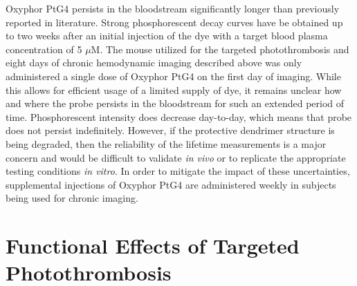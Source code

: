 Oxyphor PtG4 persists in the bloodstream significantly longer than previously reported in literature. Strong phosphorescent decay curves have be obtained up to two weeks after an initial injection of the dye with a target blood plasma concentration of 5 $\mu$M. The mouse utilized for the targeted photothrombosis and eight days of chronic hemodynamic imaging described above was only administered a single dose of Oxyphor PtG4 on the first day of imaging. While this allows for efficient usage of a limited supply of dye, it remains unclear how and where the probe persists in the bloodstream for such an extended period of time. Phosphorescent intensity does decrease day-to-day, which means that probe does not persist indefinitely. However, if the protective dendrimer structure is being degraded, then the reliability of the lifetime measurements is a major concern and would be difficult to validate \textit{in vivo} or to replicate the appropriate testing conditions \textit{in vitro}. In order to mitigate the impact of these uncertainties, supplemental injections of Oxyphor PtG4 are administered weekly in subjects being used for chronic imaging.



\section{Functional Effects of Targeted Photothrombosis}

